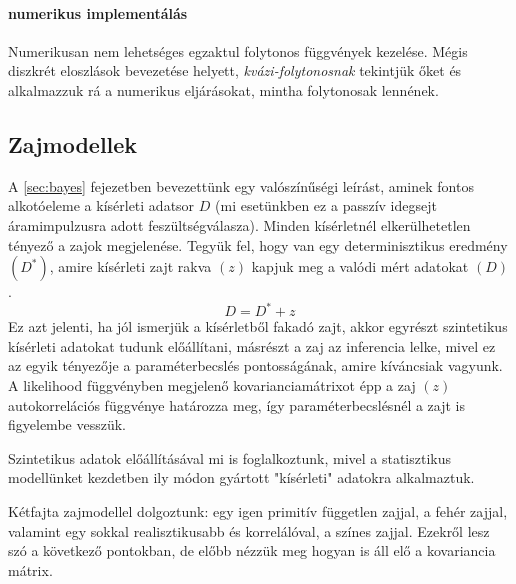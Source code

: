 \paragraph{numerikus implementálás}
Numerikusan nem lehetséges egzaktul folytonos függvények kezelése. Mégis diszkrét eloszlások bevezetése helyett, \textit{kvázi-folytonosnak} tekintjük őket és alkalmazzuk rá a numerikus eljárásokat, mintha folytonosak lennének.




\subsection{Zajmodellek}\label{sec:noise}
A \ref{sec:bayes} fejezetben bevezettünk egy valószínűségi leírást, aminek fontos alkotóeleme a kísérleti adatsor $D$ (mi esetünkben ez a passzív idegsejt áramimpulzusra adott feszültségválasza). Minden kísérletnél elkerülhetetlen tényező a zajok megjelenése. Tegyük fel, hogy van egy determinisztikus eredmény $(D^*)$, amire kísérleti zajt rakva $(z)$ kapjuk meg a valódi mért adatokat $(D)$. 
\[
D = D^* + z
\]
Ez azt jelenti, ha jól ismerjük a kísérletből fakadó zajt, akkor egyrészt szintetikus kísérleti adatokat tudunk előállítani, másrészt a zaj az inferencia lelke, mivel ez az egyik tényezője a paraméterbecslés pontosságának, amire kíváncsiak vagyunk. A likelihood függvényben megjelenő kovarianciamátrixot épp a zaj $(z)$ autokorrelációs függvénye határozza meg, így paraméterbecslésnél a zajt is figyelembe vesszük.

Szintetikus adatok előállításával mi is foglalkoztunk, mivel a statisztikus modellünket kezdetben ily módon gyártott "kísérleti" adatokra alkalmaztuk.

Kétfajta zajmodellel dolgoztunk: egy igen primitív független zajjal, a fehér zajjal, valamint egy sokkal realisztikusabb és korrelálóval, a színes zajjal. Ezekről lesz szó a következő pontokban, de előbb nézzük meg hogyan is áll elő a kovariancia mátrix.

